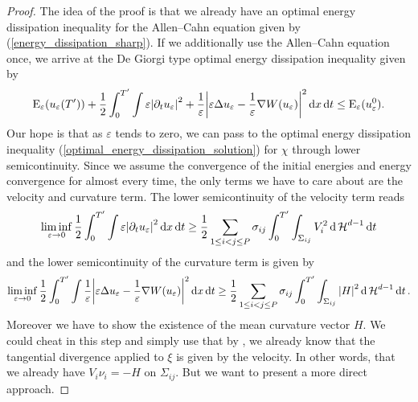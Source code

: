 \begin{proof}
	The idea of the proof is that we already have an optimal energy dissipation 
	inequality for the Allen--Cahn equation given by 
	(\ref{energy_dissipation_sharp}).
	If we additionally use the Allen--Cahn equation once, we arrive at 
	the De Giorgi type optimal energy dissipation inequality given 
	by
	\begin{equation*}
	\label{energy_dissipation_sharp_with_curvature}
	\operatorname{E}_{ \varepsilon } ( u_{ \varepsilon } ( T' ) )
	+
	\frac{ 1 }{ 2 }
	\int_{ 0 }^{ T' }
		\int
			\varepsilon \abs{ \partial_{ t } u_{ \varepsilon } }^{ 2 }
			+
			\frac{ 1 }{ \varepsilon }
			\abs{
				\varepsilon \Delta u_{ \varepsilon } 
				-
				\frac{ 1 }{ \varepsilon } \nabla W ( u_{ \varepsilon } )
			}^{ 2 }
		\dd{ x }
	\dd{ t }
	\leq
	\operatorname{E}_{ \varepsilon } ( u_{ \varepsilon}^{ 0 } ).
	\end{equation*}
	Our hope is that as $ \varepsilon $ tends to zero, we can pass to the 
	optimal energy dissipation inequality 
	(\ref{optimal_energy_dissipation_solution}) for $ \chi $ through lower 
	semicontinuity. 
	Since we assume the convergence of the initial energies and energy 
	convergence for almost every time, the only terms we have to care about are
	the velocity and curvature term. 
	The lower semicontinuity of the velocity term reads
	\begin{equation}
		\label{lsc_of_velocity}
		\liminf_{ \varepsilon \to 0 }
			\frac{ 1 }{ 2 }
			\int_{ 0 }^{ T' }
				\int
					\varepsilon 
					\abs{ \partial_{ t } u_{ \varepsilon } }^{ 2 }
				\dd{ x }
			\dd{ t }
		\geq
		\frac{ 1 }{ 2 }
		\sum_{ 1 \leq i < j \leq P }
			\sigma_{ i j }
			\int_{ 0 }^{ T' }
				\int_{ \Sigma_{ i j } }
					V_{ i }^{ 2 }
				\dd{ \operatorname{\mathcal{H}}^{ d - 1 } }
			\dd{ t }
	\end{equation}
	and the lower semicontinuity of the curvature term is given by
	\begin{equation}
		\label{lsc_of_curvature}
		\liminf_{ \varepsilon \to 0 }
			\frac{ 1 }{ 2 }
			\int_{ 0 }^{ T' }
				\int
					\frac{ 1 }{ \varepsilon }
					\abs{
						\varepsilon
						\Delta u_{ \varepsilon }
						-
						\frac{ 1 }{ \varepsilon }
						\nabla W ( u_{ \varepsilon } ) 
					}^{ 2 }
				\dd{ x }
			\dd{ t }
		\geq
		\frac{ 1 }{ 2 }
		\sum_{ 1 \leq i < j \leq P }
			\sigma_{ i j }
			\int_{ 0 }^{ T' }
				\int_{ \Sigma_{ i j } }
					\abs{ H }^{ 2 }
				\dd{ \operatorname{\mathcal{H}}^{ d - 1 } }
			\dd{ t }.
	\end{equation}
	Moreover we have to show the existence of the mean curvature vector $ H $.
	We could cheat in this step and simply use that by 
	, we already know that the tangential 
	divergence applied to $ \xi $ is given by the velocity. In other words, 
	that we already have $ V_{ i } \nu_{ i } = -H $ on $ \Sigma_{ i j } $. But 
	we want 
	to present a more direct approach.
	

\end{proof}
